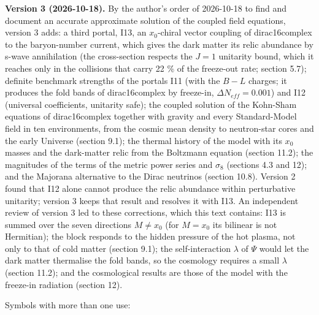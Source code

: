 \documentclass[
  10pt,
]{article}
\begin{document}
\textbf{Version 3 (2026-10-18).} By the author's order of 2026-10-18 to
find and document an accurate approximate solution of the coupled field
equations, version 3 adds: a third portal, I13, an \(x_0\)-chiral vector
coupling of dirac16complex to the baryon-number current, which gives the
dark matter its relic abundance by s-wave annihilation (the
cross-section respects the \(J = 1\) unitarity bound, which it reaches
only in the collisions that carry 22 \% of the freeze-out rate; section
5.7); definite benchmark strengths of the portals I11 (with the
\(B - L\) charges; it produces the fold bands of dirac16complex by
freeze-in, \(\Delta N_{eff} = 0.001\)) and I12 (universal coefficients,
unitarity safe); the coupled solution of the Kohn-Sham equations of
dirac16complex together with gravity and every Standard-Model field in
ten environments, from the cosmic mean density to neutron-star cores and
the early Universe (section 9.1); the thermal history of the model with
its \(x_0\) masses and the dark-matter relic from the Boltzmann equation
(section 11.2); the magnitudes of the terms of the metric power series
and \(\sigma_8\) (sections 4.3 and 12); and the Majorana alternative to
the Dirac neutrinos (section 10.8). Version 2 found that I12 alone
cannot produce the relic abundance within perturbative unitarity;
version 3 keeps that result and resolves it with I13. An independent
review of version 3 led to these corrections, which this text contains:
I13 is summed over the seven directions \(M \ne x_0\) (for \(M = x_0\)
its bilinear is not Hermitian); the block responds to the hidden
pressure of the hot plasma, not only to that of cold matter (section
9.1); the self-interaction \(\lambda\) of \(\Psi\) would let the dark
matter thermalise the fold bands, so the cosmology requires a small
\(\lambda\) (section 11.2); and the cosmological results are those of
the model with the freeze-in radiation (section 12).

Symbols with more than one use:
\end{document}
